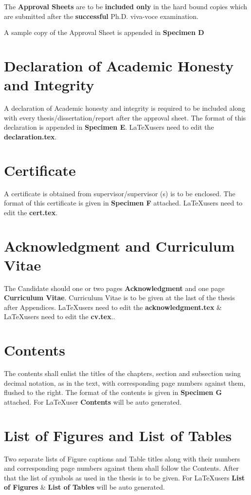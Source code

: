 The \textbf{Approval Sheets} are to be \textbf{included only} in the hard bound copies which are submitted after the \textbf{successful} Ph.D. viva-voce examination.
\par A sample copy of the Approval Sheet is appended in \textbf{Specimen D}
\section{Declaration of Academic Honesty and Integrity}

\par A declaration of Academic honesty and integrity is required to be included along with every thesis/dissertation/report after the approval sheet. The format of this declaration is appended in \textbf{Specimen E}. \LaTeX users need to edit the \textbf{declaration.tex}.
\section{Certificate}
A certificate is obtained from supervisor/supervisor (s) is to be enclosed. The format of this certificate is given in \textbf{Specimen F} attached. \LaTeX users need to edit the \textbf{cert.tex}.
\section{Acknowledgment and Curriculum Vitae}
The Candidate should  one or two pages \textbf{Acknowledgment} and one page \textbf{Curriculum Vitae}. Curriculum Vitae is to be given at the last of the thesis after Appendices. \LaTeX users need to edit the \textbf{acknowledgment.tex} \& \LaTeX users need to edit the \textbf{cv.tex}..
\section{Contents}
The contents shall enlist the titles of the chapters, section and subsection using decimal notation, as in the text, with corresponding page numbers against them, flushed to the right. The format of the contents is given in \textbf{Specimen G} attached. For \LaTeX user \textbf{Contents} will be auto generated.
\section{List of Figures and List of Tables}
Two separate lists of Figure captions and Table titles along with their numbers and corresponding page numbers against them shall follow the Contents. After that the list of symbols as used in the thesis is to be given. For \LaTeX users \textbf{List of Figures} \& \textbf{List of Tables} will be auto generated.
